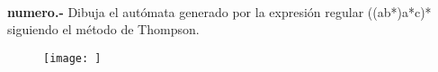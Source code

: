 \paragraph{}
\textbf{{numero}.-} Dibuja el autómata generado por la expresión regular ((a\textbar b*)a*c)* siguiendo el método de Thompson.
\begin{figure}[ht!]
\centering
\texttt{[image: ]}
\end{figure}